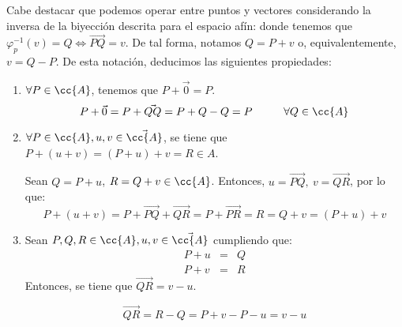 Cabe destacar que podemos operar entre puntos y vectores considerando la inversa de la biyección descrita para el espacio afín:
donde tenemos que $\varphi_p^{-1}(v)=Q\Longleftrightarrow \vec{PQ}=v$. De tal forma, notamos $Q=P+v$ o, equivalentemente, $v=Q-P$. De esta notación, deducimos las siguientes propiedades:
\begin{enumerate}
    \item $\forall P\in \cc{A}$, tenemos que $P+\vec{0}=P$.
    \begin{equation*}
        P+\vec{0} = P+\vec{QQ} = P+Q-Q=P \hspace{1cm} \forall Q\in \cc{A}
    \end{equation*}
    \item $\forall P\in \cc{A}, u,v\in \vec{\cc{A}}$, se tiene que $P+(u+v)=(P+u)+v=R\in A$.
    
    Sean $Q=P+u$, $R=Q+v\in \cc{A}$. Entonces, $u=\vec{PQ},~v=\vec{QR}$, por lo que:
    \begin{equation*}
        P + (u+v) = P + \vec{PQ} + \vec{QR} = P + \vec{PR} = R = Q+v = (P+u)+v
    \end{equation*}

    \item Sean $P,Q,R\in \cc{A}, u,v\in \vec{\cc{A}}$ cumpliendo que:
    \begin{equation*}
        \begin{array}{rcl}
            P+u & = & Q  \\
            P+v & = & R
        \end{array}
    \end{equation*}
    Entonces, se tiene que $\vec{QR}=v-u$.

    \begin{equation*}
        \vec{QR} = R-Q = P+v-P-u = v-u
    \end{equation*}
\end{enumerate}


